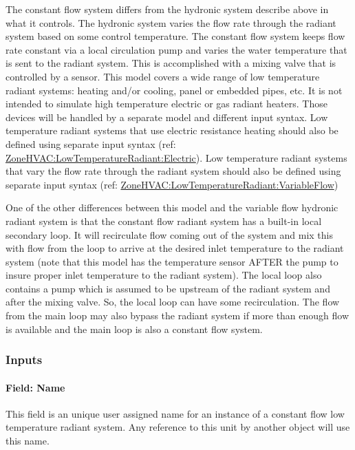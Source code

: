 The constant flow system differs from the hydronic system describe above in what it controls. The hydronic system varies the flow rate through the radiant system based on some control temperature. The constant flow system keeps flow rate constant via a local circulation pump and varies the water temperature that is sent to the radiant system. This is accomplished with a mixing valve that is controlled by a sensor. This model covers a wide range of low temperature radiant systems: heating and/or cooling, panel or embedded pipes, etc. It is not intended to simulate high temperature electric or gas radiant heaters. Those devices will be handled by a separate model and different input syntax. Low temperature radiant systems that use electric resistance heating should also be defined using separate input syntax (ref: \hyperref[zonehvaclowtemperatureradiantelectric]{ZoneHVAC:LowTemperatureRadiant:Electric}). Low temperature radiant systems that vary the flow rate through the radiant system should also be defined using separate input syntax (ref: \hyperref[zonehvaclowtemperatureradiantvariableflow]{ZoneHVAC:LowTemperatureRadiant:VariableFlow})

One of the other differences between this model and the variable flow hydronic radiant system is that the constant flow radiant system has a built-in local secondary loop. It will recirculate flow coming out of the system and mix this with flow from the loop to arrive at the desired inlet temperature to the radiant system (note that this model has the temperature sensor AFTER the pump to insure proper inlet temperature to the radiant system). The local loop also contains a pump which is assumed to be upstream of the radiant system and after the mixing valve. So, the local loop can have some recirculation. The flow from the main loop may also bypass the radiant system if more than enough flow is available and the main loop is also a constant flow system.

\subsubsection{Inputs}\label{inputs-6-019}

\paragraph{Field: Name}\label{field-name-6-016}

This field is an unique user assigned name for an instance of a constant flow low temperature radiant system. Any reference to this unit by another object will use this name.

